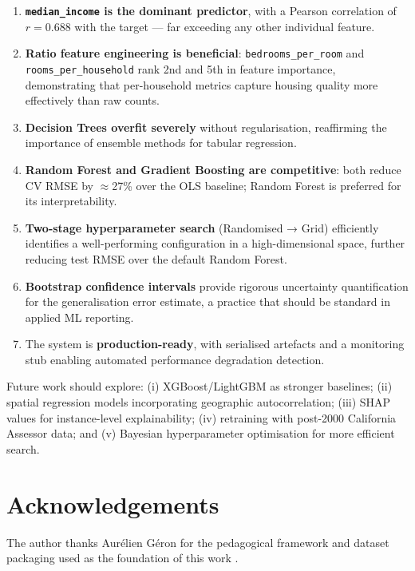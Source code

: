 \documentclass[conference]{IEEEtran}
\begin{document}
\begin{enumerate}
    \item \textbf{\texttt{median\_income} is the dominant predictor}, with a Pearson correlation of $r = 0.688$ with the target — far exceeding any other individual feature.
    \item \textbf{Ratio feature engineering is beneficial}: \texttt{bedrooms\_per\_room} and \texttt{rooms\_per\_household} rank 2nd and 5th in feature importance, demonstrating that per-household metrics capture housing quality more effectively than raw counts.
    \item \textbf{Decision Trees overfit severely} without regularisation, reaffirming the importance of ensemble methods for tabular regression.
    \item \textbf{Random Forest and Gradient Boosting are competitive}: both reduce CV RMSE by $\approx$27\% over the OLS baseline; Random Forest is preferred for its interpretability.
    \item \textbf{Two-stage hyperparameter search} (Randomised → Grid) efficiently identifies a well-performing configuration in a high-dimensional space, further reducing test RMSE over the default Random Forest.
    \item \textbf{Bootstrap confidence intervals} provide rigorous uncertainty quantification for the generalisation error estimate, a practice that should be standard in applied ML reporting.
    \item The system is \textbf{production-ready}, with serialised artefacts and a monitoring stub enabling automated performance degradation detection.

\end{enumerate}

Future work should explore: (i) XGBoost/LightGBM as stronger baselines; (ii) spatial regression models incorporating geographic autocorrelation; (iii) SHAP values for instance-level explainability; (iv) retraining with post-2000 California Assessor data; and (v) Bayesian hyperparameter optimisation for more efficient search.

\section*{Acknowledgements}

The author thanks Aurélien Géron for the pedagogical framework and dataset packaging used as the foundation of this work \cite{geron2019}.
\end{document}
